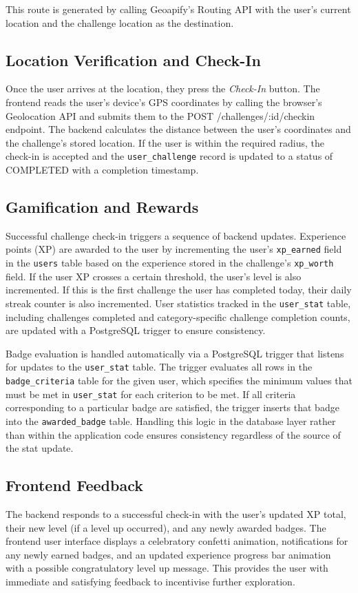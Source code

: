 \documentclass{vgtc}                          %
\begin{document}
This route is generated by calling Geoapify's Routing API with the user's current location and the challenge location as the destination.

\subsection{Location Verification and Check-In}
Once the user arrives at the location, they press the \textit{Check-In} button. 
The frontend reads the user's device's GPS coordinates by calling the browser's Geolocation API and submits them to the POST /challenges/:id/checkin endpoint. The backend calculates the distance between the user's coordinates and the challenge's stored location. If the user is within the required radius, the check-in is accepted and the \texttt{user\_challenge} record is updated to a status of COMPLETED with a completion timestamp.

\subsection{Gamification and Rewards}
Successful challenge check-in triggers a sequence of backend updates. Experience points (XP) are awarded to the user by incrementing the user's \texttt{xp\_earned} field in the \texttt{users} table based on the experience stored in the challenge's \texttt{xp\_worth} field. If the user XP crosses a certain threshold, the user's level is also incremented. If this is the first challenge the user has completed today, their daily streak counter is also incremented. User statistics tracked in the \texttt{user\_stat} table, including challenges completed and category-specific challenge completion counts, are updated with a PostgreSQL trigger to ensure consistency.

Badge evaluation is handled automatically via a PostgreSQL trigger that listens for updates to the \texttt{user\_stat} table. The trigger evaluates all rows in the \texttt{badge\_criteria} table for the given user, which specifies the minimum values that must be met in \texttt{user\_stat} for each criterion to be met. If all criteria corresponding to a particular badge are satisfied, the trigger inserts that badge into the \texttt{awarded\_badge} table. Handling this logic in the database layer rather than within the application code ensures consistency regardless of the source of the stat update.

\subsection{Frontend Feedback}
The backend responds to a successful check-in with the user's updated XP total, their new level (if a level up occurred), and any newly awarded badges. The frontend user interface displays a celebratory confetti animation, notifications for any newly earned badges, and an updated experience progress bar animation with a possible congratulatory level up message. This provides the user with immediate and satisfying feedback to incentivise further exploration.
\end{document}
